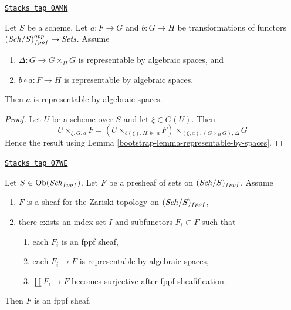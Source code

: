 \begin{lemma}
\label{bootstrap-lemma-representable-by-spaces-permanence}
\href{https://stacks.math.columbia.edu/tag/0AMN}{\texttt{Stacks tag 0AMN}}

Let $S$ be a scheme. Let $a : F \to G$ and $b : G \to H$ be
transformations of functors $(\mathit{Sch}/S)_{fppf}^{opp} \to \textit{Sets}$.
Assume
\begin{enumerate}
\item $\Delta : G \to G \times_H G$ is representable
by algebraic spaces, and
\item $b \circ a : F \to H$ is representable by algebraic spaces.
\end{enumerate}
Then $a$ is representable by algebraic spaces.
\end{lemma}

\begin{proof}

Let $U$ be a scheme over $S$ and let $\xi \in G(U)$. Then
$$
U \times_{\xi, G, a} F =
(U \times_{b(\xi), H, b \circ a} F) \times_{(\xi, a), (G \times_H G), \Delta} G
$$
Hence the result using Lemma \ref{bootstrap-lemma-representable-by-spaces}.
\end{proof}

\begin{lemma}
\label{bootstrap-lemma-glueing-sheaves}
\href{https://stacks.math.columbia.edu/tag/07WE}{\texttt{Stacks tag 07WE}}

Let $S \in \operatorname{Ob}(\mathit{Sch}_{fppf})$. Let $F$ be a presheaf of sets on
$(\mathit{Sch}/S)_{fppf}$. Assume
\begin{enumerate}
\item $F$ is a sheaf for the Zariski topology on $(\mathit{Sch}/S)_{fppf}$,
\item there exists an index set $I$ and subfunctors $F_i \subset F$ such that
\begin{enumerate}
\item each $F_i$ is an fppf sheaf,
\item each $F_i \to F$ is representable by algebraic spaces,
\item $\coprod F_i \to F$ becomes surjective after fppf sheafification.
\end{enumerate}
\end{enumerate}
Then $F$ is an fppf sheaf.
\end{lemma}

